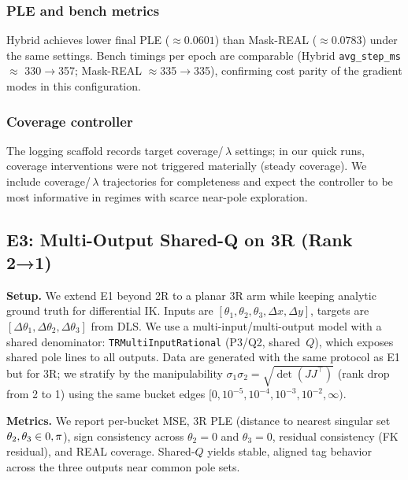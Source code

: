 \documentclass[11pt,twoside]{article}
\begin{document}
\subsubsection{PLE and bench metrics}

Hybrid achieves lower final PLE ($\approx0.0601$) than Mask-REAL ($\approx0.0783$) under the same settings. Bench timings per epoch are comparable (Hybrid \texttt{avg\_step\_ms} $\approx$ 330$\rightarrow$357; Mask-REAL $\approx$335$\rightarrow$335), confirming cost parity of the gradient modes in this configuration.

\subsubsection{Coverage controller}

The logging scaffold records target coverage/\,$\lambda$ settings; in our quick runs, coverage interventions were not triggered materially (steady coverage). We include coverage/\,$\lambda$ trajectories for completeness and expect the controller to be most informative in regimes with scarce near-pole exploration.

\subsection{E3: Multi-Output Shared-Q on 3R (Rank 2→1)}
\textbf{Setup.} We extend E1 beyond 2R to a planar 3R arm while keeping analytic ground truth for differential IK. Inputs are $[\theta_1,\theta_2,\theta_3,\Delta x,\Delta y]$, targets are $[\Delta\theta_1,\Delta\theta_2,\Delta\theta_3]$ from DLS. We use a multi-input/multi-output model with a shared denominator: \texttt{TRMultiInputRational} (P3/Q2, shared\, $Q$), which exposes shared pole lines to all outputs. Data are generated with the same protocol as E1 but for 3R; we stratify by the manipulability $\sigma_1\sigma_2 = \sqrt{\det(JJ^\top)}$ (rank drop from 2 to 1) using the same bucket edges $[0,10^{-5},10^{-4},10^{-3},10^{-2},\infty)$.

\textbf{Metrics.} We report per-bucket MSE, 3R PLE (distance to nearest singular set $\\{\theta_2,\theta_3\\}\in\\{0,\pi\\}$), sign consistency across $\theta_2=0$ and $\theta_3=0$, residual consistency (FK residual), and REAL coverage. Shared-$Q$ yields stable, aligned tag behavior across the three outputs near common pole sets.
\end{document}
